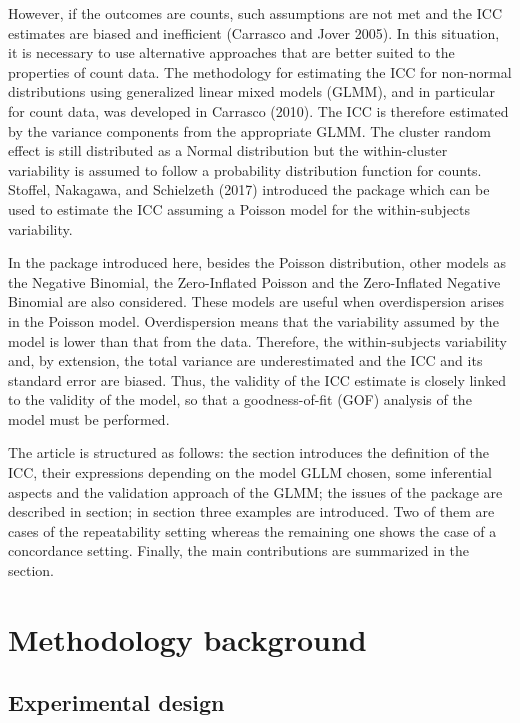 However, if the outcomes are counts, such assumptions are not met and the ICC estimates are biased and inefficient (Carrasco and Jover 2005). In this situation, it is necessary to use alternative approaches that are better suited to the properties of count data. The methodology for estimating the ICC for non-normal distributions using generalized linear mixed models (GLMM), and in particular for count data, was developed in Carrasco (2010). The ICC is therefore estimated by the variance components from the appropriate GLMM. The cluster random effect is still distributed as a Normal distribution but the within-cluster variability is assumed to follow a probability distribution function for counts. Stoffel, Nakagawa, and Schielzeth (2017) introduced the  package which can be used to estimate the ICC assuming a Poisson model for the within-subjects variability.

In the  package introduced here, besides the Poisson distribution, other models as the Negative Binomial, the Zero-Inflated Poisson and the Zero-Inflated Negative Binomial are also considered. These models are useful when overdispersion arises in the Poisson model. Overdispersion means that the variability assumed by the model is lower than that from the data. Therefore, the within-subjects variability and, by extension, the total variance are underestimated and the ICC and its standard error are biased. Thus, the validity of the ICC estimate is closely linked to the validity of the model, so that a goodness-of-fit (GOF) analysis of the model must be performed.

The article is structured as follows: the  section introduces the definition of the ICC, their expressions depending on the model GLLM chosen, some inferential aspects and the validation approach of the GLMM; the issues of the package are described in  section; in  section three examples are introduced. Two of them are cases of the repeatability setting whereas the remaining one shows the case of a concordance setting. Finally, the main contributions are summarized in the  section.

\hypertarget{methodology-background}{%
\section{Methodology background}\label{methodology-background}}

\hypertarget{experimental-design}{%
\subsection{Experimental design}\label{experimental-design}}

